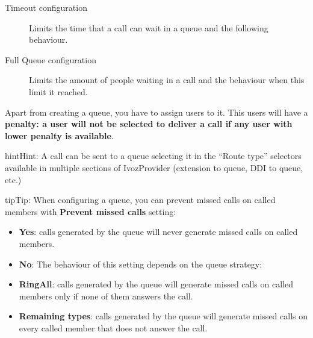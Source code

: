 \documentclass[letterpaper,10pt,english]{sphinxmanual}
\begin{document}
\begin{description}
\item[{Timeout configuration}] \leavevmode{}\label{administration_portal/client/vpbx/routing_endpoints/queues:term-timeout-configuration}
Limits the time that a call can wait in a queue and the following behaviour.

\item[{Full Queue configuration}] \leavevmode{}\label{administration_portal/client/vpbx/routing_endpoints/queues:term-full-queue-configuration}
Limits the amount of people waiting in a call and the behaviour when this limit
it reached.

\end{description}

Apart from creating a queue, you have to assign users to it. This users will have
a \textbf{penalty: a user will not be selected to deliver a call if any user with lower
penalty is available}.

\begin{notice}{hint}{Hint:}
A call can be sent to a queue selecting it in the ``Route type'' selectors
available in multiple sections of IvozProvider (extension to queue, DDI
to queue, etc.)
\end{notice}

\begin{notice}{tip}{Tip:}
When configuring a queue, you can prevent missed calls on called members with \textbf{Prevent missed calls} setting:
\begin{itemize}
\item {} 
\textbf{Yes}: calls generated by the queue will never generate missed calls on called members.

\item {} 
\textbf{No}: The behaviour of this setting depends on the queue strategy:

\item {} 
\textbf{RingAll}: calls generated by the queue will generate missed calls on called members only if none of them answers the call.

\item {} 
\textbf{Remaining types}: calls generated by the queue will generate missed calls on every called member that does not answer the call.

\end{itemize}
\end{notice}
\end{document}
